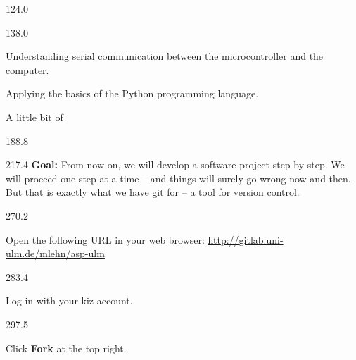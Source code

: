 \documentclass{aslab}
\newcommand*\bluelink[2]{\href{#1}{\textcolor{aslabblue}{#2}}}
\begin{document}
\maketitleblock

\begin{region}{124.0}
\end{region}

\begin{region}[pitch=12.1]{138.0}
\begin{bluedash}
\item Understanding serial communication between the microcontroller and
  the computer.
\item Applying the basics of the Python programming language.
\item A little bit of 
\end{bluedash}
\end{region}

\begin{region}{188.8}
\end{region}

\begin{region}[pitch=13.25]{217.4}
\textbf{Goal:} From now on, we will develop a software project step by step.
We will proceed one step at a time -- and things will surely go wrong now
and then. But that is exactly what we have git for -- a tool for version
control.
\end{region}

\begin{region}{270.2}
\begin{tasks}
\item Open the following URL in your web browser:
  \bluelink{http://gitlab.uni-ulm.de/mlehn/asp-ulm}{http://gitlab.uni-ulm.de/mlehn/asp-ulm}
\end{tasks}
\end{region}

\begin{region}{283.4}
\begin{tasks}[start=2]
\item Log in with your kiz account.
\end{tasks}
\end{region}

\begin{region}{297.5}
\begin{tasks}[start=3]
\item Click \textbf{Fork} at the top right.
\end{tasks}
\end{region}
\end{document}
